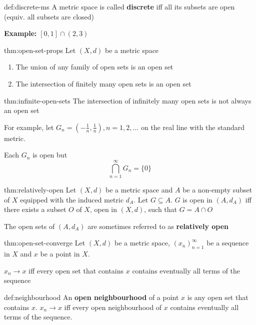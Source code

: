 \documentclass[landscape, 8pt]{extarticle}
\begin{document}
\begin{multicols}{3}
\begin{dfn}{def:discrete-ms}{}
    A metric space is called \textbf{discrete} iff all its subsets are open (equiv. all subsets are closed)

    \textbf{Example:} $[0,1]\cap (2,3)$
\end{dfn}


\begin{thm}{thm:open-set-props}{}
    Let $(X,d)$ be a metric space
    \begin{enumerate}
        \item The union of any family of open sets is an open set
        \item The intersection of finitely many open sets is an open set
    \end{enumerate}
\end{thm}

\begin{thm}{thm:infinite-open-sets}{}
    The intersection of infinitely many open sets is not always an open set
    
    For example, let $G_{n} = (- \frac{1}{n}, \frac{1}{n}), n = 1,2,\dots$ on the real line with the standard metric.

    Each $G_{n}$ is open but
    \[\bigcap\limits_{n = 1}^{\infty} G_{n} = \{0\}\]
\end{thm}

\begin{thm}{thm:relatively-open}{}
    Let $(X,d)$ be a metric space and $A$ be a non-empty subset of $X$ equipped with the induced metric $d_{A}$. Let $G\subseteq A$. $G$ is open in $(A, d_{A})$ iff there exists a subset $O$ of $X$, open in $(X,d)$, such that $G = A \cap O$

    The open sets of $(A, d_{A})$ are sometimes referred to as \textbf{relatively open}
\end{thm}

\begin{thm}[]{thm:open-set-converge}{}
    Let $(X, d)$ be a metric space, $(x_{n})^{\infty}_{n=1}$ be a sequence in $X$ and $x$ be a point in $X$.

    $x_{n}\to x$ iff every open set that contains $x$ contains eventually all terms of the sequence
\end{thm}

\begin{dfn}{def:neighbourhood}{}
    An \textbf{open neighbourhood} of a point $x$ is any open set that contains $x$. $x_{n}\to x$ iff every open neighbourhood of $x$ contains eventually all terms of the sequence.


\end{dfn}
\end{multicols}
\end{document}
